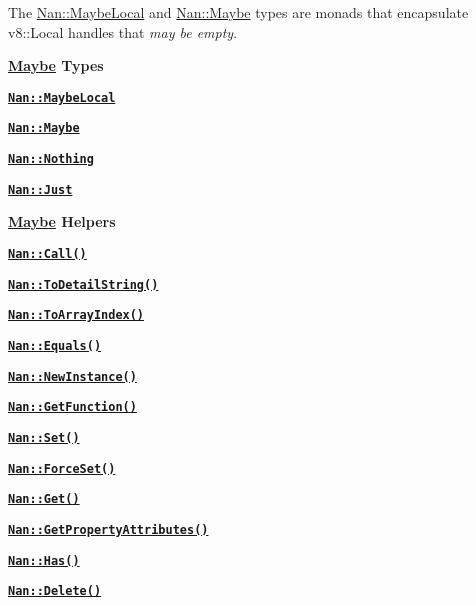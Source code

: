 The {\ttfamily \hyperlink{class_nan_1_1_maybe_local}{Nan\+::\+Maybe\+Local}} and {\ttfamily \hyperlink{class_nan_1_1_maybe}{Nan\+::\+Maybe}} types are monads that encapsulate {\ttfamily v8\+::\+Local} handles that {\itshape may be empty}.


\begin{DoxyItemize}
\item {\bfseries \hyperlink{class_maybe}{Maybe} Types}
\begin{DoxyItemize}
\item \href{#api_nan_maybe_local}{\tt {\bfseries {\ttfamily Nan\+::\+Maybe\+Local}}}
\item \href{#api_nan_maybe}{\tt {\bfseries {\ttfamily Nan\+::\+Maybe}}}
\item \href{#api_nan_nothing}{\tt {\bfseries {\ttfamily Nan\+::\+Nothing}}}
\item \href{#api_nan_just}{\tt {\bfseries {\ttfamily Nan\+::\+Just}}}
\end{DoxyItemize}
\item {\bfseries \hyperlink{class_maybe}{Maybe} Helpers}
\begin{DoxyItemize}
\item \href{#api_nan_call}{\tt {\bfseries {\ttfamily Nan\+::\+Call()}}}
\item \href{#api_nan_to_detail_string}{\tt {\bfseries {\ttfamily Nan\+::\+To\+Detail\+String()}}}
\item \href{#api_nan_to_array_index}{\tt {\bfseries {\ttfamily Nan\+::\+To\+Array\+Index()}}}
\item \href{#api_nan_equals}{\tt {\bfseries {\ttfamily Nan\+::\+Equals()}}}
\item \href{#api_nan_new_instance}{\tt {\bfseries {\ttfamily Nan\+::\+New\+Instance()}}}
\item \href{#api_nan_get_function}{\tt {\bfseries {\ttfamily Nan\+::\+Get\+Function()}}}
\item \href{#api_nan_set}{\tt {\bfseries {\ttfamily Nan\+::\+Set()}}}
\item \href{#api_nan_force_set}{\tt {\bfseries {\ttfamily Nan\+::\+Force\+Set()}}}
\item \href{#api_nan_get}{\tt {\bfseries {\ttfamily Nan\+::\+Get()}}}
\item \href{#api_nan_get_property_attribute}{\tt {\bfseries {\ttfamily Nan\+::\+Get\+Property\+Attributes()}}}
\item \href{#api_nan_has}{\tt {\bfseries {\ttfamily Nan\+::\+Has()}}}
\item \href{#api_nan_delete}{\tt {\bfseries {\ttfamily Nan\+::\+Delete()}}}

\end{DoxyItemize}
\end{DoxyItemize}
